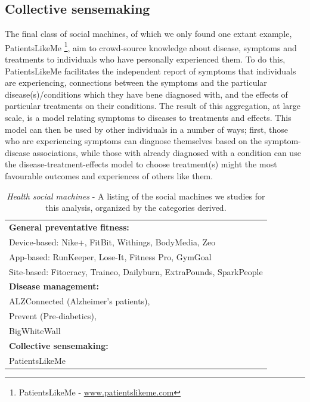 \documentclass{sig-alternate}
\begin{document}
\subsection{Collective sensemaking}
The final class of social machines, of which we only found one extant
example, PatientsLikeMe \footnote{PatientsLikeMe -
  \url{www.patientslikeme.com}}, aim to crowd-source knowledge about
disease, symptoms and treatments to individuals who have personally
experienced them.  To do this, PatientsLikeMe facilitates the
independent report of symptoms that individuals are experiencing,
connections between the symptoms and the particular
disease(s)/conditions which they have bene diagnosed with, and the
effects of particular treatments on their conditions.  The result of
this aggregation, at large scale, is a model relating symptoms to
diseases to treatments and effects.  This model can then be used by
other individuals in a number of ways; first, those who are
experiencing symptoms can diagnose themselves based on the
symptom-disease associations, while those with already diagnosed with
a condition can use the disease-treatment-effects model to choose
treatment(s) might the most favourable outcomes and experiences of
others like them.

\begin{table}[htb]
\begin{center}
\begin{tabular}{|p{8cm}|}
\hline
{\bf General preventative fitness:} \\
Device-based: Nike+, FitBit, Withings, BodyMedia, Zeo \\
App-based: RunKeeper, Lose-It, Fitness Pro, GymGoal \\
Site-based: Fitocracy, Traineo, Dailyburn, ExtraPounds, SparkPeople  \\
\hline
{\bf Disease management:} \\
ALZConnected (Alzheimer's patients),  \\
Prevent (Pre-diabetics), \\
BigWhiteWall \\
\hline
{\bf Collective sensemaking:} \\
PatientsLikeMe \\
\hline
\end{tabular}
\end{center}
\caption{\emph{Health social machines} - A listing of the social
  machines we studies for this analysis, organized by the categories
  derived.} \label{table:clusters}
\end{table}
\end{document}
